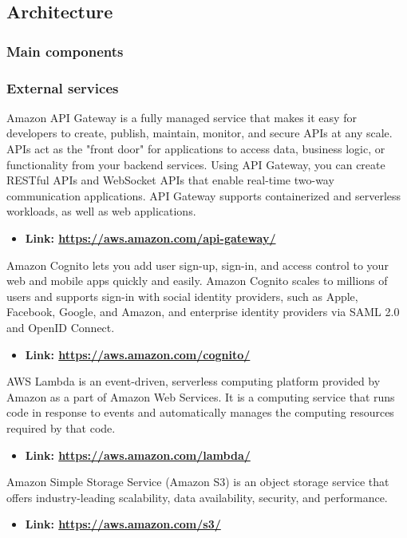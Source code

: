 \subsection{Architecture}
\subsubsection{Main components}
\subsubsection{External services}
Amazon API Gateway is a fully managed service that makes it easy for developers to create, publish, maintain, monitor,
and secure APIs at any scale. APIs act as the "front door" for applications to access data, business logic,
or functionality from your backend services. Using API Gateway, you can create RESTful APIs and WebSocket APIs that
enable real-time two-way communication applications. API Gateway supports containerized and serverless workloads,
as well as web applications.
\begin{itemize}
    \item \textbf{Link: \url{https://aws.amazon.com/api-gateway/}}
\end{itemize}
Amazon Cognito lets you add user sign-up, sign-in, and access control to your web and mobile apps quickly and easily.
Amazon Cognito scales to millions of users and supports sign-in with social identity providers, such as Apple,
Facebook, Google, and Amazon, and enterprise identity providers via SAML 2.0 and OpenID Connect.
\begin{itemize}
    \item \textbf{Link: \url{https://aws.amazon.com/cognito/}}
\end{itemize}
AWS Lambda is an event-driven, serverless computing platform provided by Amazon as a part of Amazon Web Services.
It is a computing service that runs code in response to events and automatically manages the computing resources required by that code.
\begin{itemize}
    \item \textbf{Link: \url{https://aws.amazon.com/lambda/}}
\end{itemize}
Amazon Simple Storage Service (Amazon S3) is an object storage service that offers industry-leading scalability,
data availability, security, and performance.
\begin{itemize}
    \item \textbf{Link: \url{https://aws.amazon.com/s3/}}
\end{itemize}
